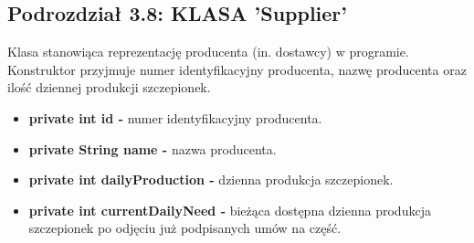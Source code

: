 \documentclass[a4paper]{article}
\begin{document}
\subsection*{Podrozdział 3.8: KLASA 'Supplier'}
\begin{flushleft}
Klasa stanowiąca reprezentację producenta (in. dostawcy) w programie. Konstruktor przyjmuje numer identyfikacyjny producenta, nazwę producenta oraz ilość dziennej produkcji szczepionek.
\end{flushleft} 
\begin{itemize}
\item \textbf{private int id -} numer identyfikacyjny producenta.
\item \textbf{private String name -} nazwa producenta.
\item \textbf{private int dailyProduction -} dzienna produkcja szczepionek.
\item \textbf{private int currentDailyNeed -} bieżąca dostępna dzienna produkcja szczepionek po odjęciu już podpisanych umów na część.
\end{itemize}
\end{document}
